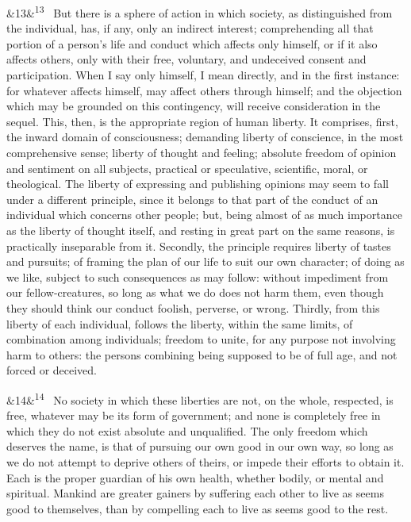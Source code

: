 \documentclass[12pt]{article}
\newcommand{\para}[1][]{\par\noindent\ifx&#1&\else\textsuperscript{\footnotesize #1}~\fi}
\begin{document}
\para[13] But there is a sphere of action in which society, as distinguished from the individual, has, if any, only an indirect interest; comprehending all that portion of a person's life and conduct which affects only himself, or if it also affects others, only with their free, voluntary, and undeceived consent and participation. When I say only himself, I mean directly, and in the first instance: for whatever affects himself, may affect others through himself; and the objection which may be grounded on this contingency, will receive consideration in the sequel. This, then, is the appropriate region of human liberty. It comprises, first, the inward domain of consciousness; demanding liberty of conscience, in the most comprehensive sense; liberty of thought and feeling; absolute freedom of opinion and sentiment on all subjects, practical or speculative, scientific, moral, or theological. The liberty of expressing and publishing opinions may seem to fall under a different principle, since it belongs to that part of the conduct of an individual which concerns other people; but, being almost of as much importance as the liberty of thought itself, and resting in great part on the same reasons, is practically inseparable from it. Secondly, the principle requires liberty of tastes and pursuits; of framing the plan of our life to suit our own character; of doing as we like, subject to such consequences as may follow: without impediment from our fellow-creatures, so long as what we do does not harm them, even though they should think our conduct foolish, perverse, or wrong. Thirdly, from this liberty of each individual, follows the liberty, within the same limits, of combination among individuals; freedom to unite, for any purpose not involving harm to others: the persons combining being supposed to be of full age, and not forced or deceived.

\para[14] No society in which these liberties are not, on the whole, respected, is free, whatever may be its form of government; and none is completely free in which they do not exist absolute and unqualified. The only freedom which deserves the name, is that of pursuing our own good in our own way, so long as we do not attempt to deprive others of theirs, or impede their efforts to obtain it. Each is the proper guardian of his own health, whether bodily, or mental and spiritual. Mankind are greater gainers by suffering each other to live as seems good to themselves, than by compelling each to live as seems good to the rest.
\end{document}
